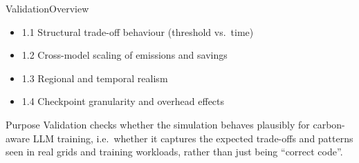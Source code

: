 \begin{frame}{Validation}{Overview}
  \begin{itemize}
    \item 1.1 Structural trade-off behaviour (threshold vs.\ time)
    \item 1.2 Cross-model scaling of emissions and savings
    \item 1.3 Regional and temporal realism
    \item 1.4 Checkpoint granularity and overhead effects
  \end{itemize}
  \vspace{0.5cm}
  \begin{block}{Purpose}
    Validation checks whether the simulation behaves plausibly for
    carbon-aware LLM
    training, i.e.\ whether it captures the expected trade-offs and patterns
    seen in real grids and training workloads, rather than just being
    ``correct code''.
  \end{block}
\end{frame}






